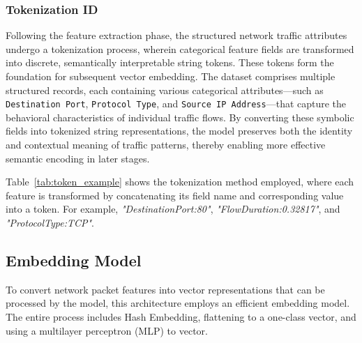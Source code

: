 \begin{ZhChapter}
    \subsubsection{Tokenization ID}
    Following the feature extraction phase, the structured network traffic attributes undergo a tokenization process, wherein categorical feature fields are transformed into discrete, semantically interpretable string tokens. These tokens form the foundation for subsequent vector embedding. The dataset comprises multiple structured records, each containing various categorical attributes—such as \texttt{Destination Port}, \texttt{Protocol Type}, and \texttt{Source IP Address}—that capture the behavioral characteristics of individual traffic flows. By converting these symbolic fields into tokenized string representations, the model preserves both the identity and contextual meaning of traffic patterns, thereby enabling more effective semantic encoding in later stages.



    Table~\ref{tab:token_example} shows the tokenization method employed, where each feature is transformed by concatenating its field name and corresponding value into a token. For example, \textit{"DestinationPort:80"}, \textit{"FlowDuration:0.32817"}, and \textit{"ProtocolType:TCP"}.

    \begin{table}[htbp]
        \centering
        \caption{Example of Tokenization}
        \label{tab:token_example}
        \vspace{1em}
    \end{table}



    \subsection{Embedding Model} %
    To convert network packet features into vector representations that can be processed by the model, this architecture employs an efficient embedding model. The entire process includes Hash Embedding, flattening to a one-class vector, and using a multilayer perceptron (MLP) to vector.




\end{ZhChapter}
